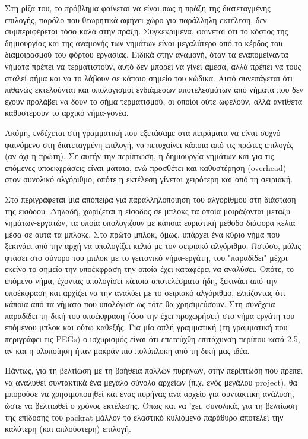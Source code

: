 Στη ρίζα του, το πρόβλημα φαίνεται να είναι πως η πράξη της διατεταγμένης επιλογής, παρόλο που θεωρητικά αφήνει χώρο για παράλληλη εκτέλεση, δεν συμπεριφέρεται τόσο καλά στην πράξη.
Συγκεκριμένα, φαίνεται ότι το κόστος της δημιουργίας και της αναμονής των νημάτων είναι μεγαλύτερο από το κέρδος του διαμοιρασμού του φόρτου εργασίας.
Ειδικά στην αναμονή, όταν τα εναπομείναντα νήματα πρέπει να τερματιστούν, αυτό δεν μπορεί να γίνει άμεσα, αλλά πρέπει να τους σταλεί σήμα και να το λάβουν σε κάποιο σημείο του κώδικα.
Αυτό συνεπάγεται ότι πιθανώς εκτελούνται και υπολογισμοί ενδιάμεσων αποτελεσμάτων από νήματα που δεν έχουν προλάβει να δουν το σήμα τερματισμού, οι οποίοι ούτε ωφελούν, αλλά αντίθετα καθυστερούν το αρχικό νήμα-γονέα.

Ακόμη, ενδέχεται στη γραμματική που εξετάσαμε στα πειράματα να είναι συχνό φαινόμενο στη διατεταγμένη επιλογή, να πετυχαίνει κάποια από τις πρώτες επιλογές (αν όχι η πρώτη).
Σε αυτήν την περίπτωση, η δημιουργία νημάτων και για τις επόμενες υποεκφράσεις είναι μάταια, ενώ προσθέτει και καθυστέρηση (overhead) στον συνολικό αλγόριθμο, οπότε η εκτέλεση γίνεται χειρότερη και από τη σειριακή.

Στο \cite{Fowler2009} περιγράφεται μία απόπειρα για παραλληλοποίηση του αλγορίθμου στη διάσταση της εισόδου.
Δηλαδή, χωρίζεται η είσοδος σε μπλοκς τα οποία μοιράζονται μεταξύ νημάτων-εργατών, τα οποία υπολογίζουν με κάποια ευριστική μέθοδο διάφορα κελιά μέσα σε αυτά τα μπλοκς.
Στο πρώτο μπλοκ, όμως, υπάρχει ένα κύριο νήμα που ξεκινάει από την αρχή να υπολογίζει κελιά με τον σειριακό αλγόριθμο.
Ωστόσο, μόλις φτάσει στο σύνορο του μπλοκ με το γειτονικό νήμα-εργάτη, του "παραδίδει" μέχρι εκείνο το σημείο την υποέκφραση την οποία έχει καταφέρει να αναλύσει.
Οπότε, το επόμενο νήμα, έχοντας υπολογίσει κάποια αποτελέσματα ήδη, ξεκινάει από την υποέκφραση και αρχίζει να την αναλύει με το σειριακό αλγόριθμο, ελπίζοντας ότι κάποια από τα νήματα που υπολόγισε ως τότε θα χρησιμεύσουν.
Στη συνέχεια παραδίδει τη δική του υποέκφραση (όσο την έχει προχωρήσει) στο νήμα-εργάτη του επόμενου μπλοκ και ούτω καθεξής. Για μία απλή γραμματική (τη γραμματική που περιγράφει τις PEGs) ο ισχυρισμός είναι ότι επετεύχθη επιτάχυνση περίπου κατά 2.5, αν και η υλοποίηση ήταν μακράν πιο πολύπλοκη από τη δική μας ιδέα.

Πάντως, για τη βελτίωση με τη βοήθεια πολλών πυρήνων, στην περίπτωση που πρέπει να αναλυθεί συντακτικά ένα μεγάλο σύνολο αρχείων (π.χ. ενός μεγάλου project), θα μπορούσε να χρησιμοποιηθεί και ένας πυρήνας ανά αρχείο για συντακτική ανάλυση, ώστε να βελτιωθεί ο χρόνος εκτέλεσης.
Όπως και να 'χει, συνολικά, για τη βελτίωση της επίδοσης του packrat μάλλον το ελαστικό κυλιόμενο παράθυρο αποτελεί την καλύτερη (και απλούστερη) επιλογή.

